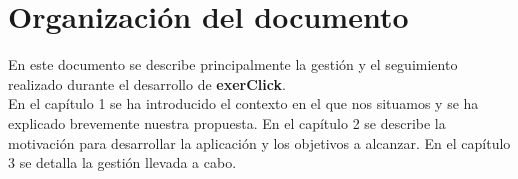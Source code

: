 \section{Organización del documento}

En este documento se describe principalmente la gestión y el seguimiento realizado durante el desarrollo de \textbf{exerClick}.\\

En el capítulo 1 se ha introducido el contexto en el que nos situamos y se ha explicado brevemente nuestra propuesta. En el capítulo 2 se describe la motivación para desarrollar la aplicación y los objetivos a alcanzar. En el capítulo 3 se detalla la gestión llevada a cabo.\\